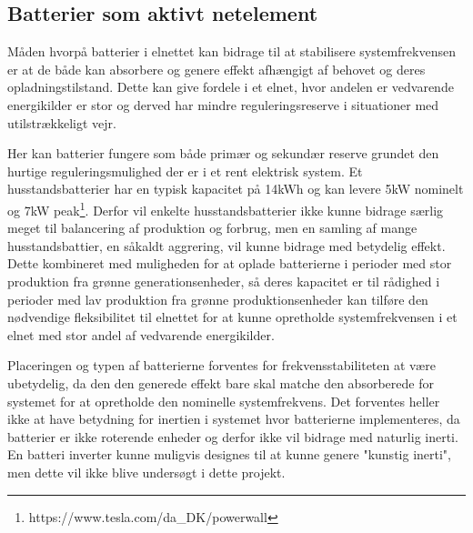 \subsection{Batterier som aktivt netelement}

Måden hvorpå batterier i elnettet kan bidrage til at stabilisere systemfrekvensen er at de både kan absorbere og genere effekt afhængigt af behovet og deres opladningstilstand. Dette kan give fordele i et elnet, hvor andelen er vedvarende energikilder er stor og derved har mindre reguleringsreserve i situationer med utilstrækkeligt vejr.

Her kan batterier fungere som både primær og sekundær reserve grundet den hurtige reguleringsmulighed der er i et rent elektrisk system. Et husstandsbatterier har en typisk kapacitet på 14kWh og kan levere 5kW nominelt og 7kW peak\footnote{https://www.tesla.com/da\_DK/powerwall}. Derfor vil enkelte husstandsbatterier ikke kunne bidrage særlig meget til balancering af produktion og forbrug, men en samling af mange husstandsbattier, en såkaldt aggrering, vil kunne bidrage med betydelig effekt. Dette kombineret med muligheden for at oplade batterierne i perioder med stor produktion fra grønne generationsenheder, så deres kapacitet er til rådighed i perioder med lav produktion fra grønne produktionsenheder kan tilføre den nødvendige fleksibilitet til elnettet for at kunne opretholde systemfrekvensen i et elnet med stor andel af vedvarende energikilder.

Placeringen og typen af batterierne forventes for frekvensstabiliteten at være ubetydelig, da den den generede effekt bare skal matche den absorberede for systemet for at opretholde den nominelle systemfrekvens. Det forventes heller ikke at have betydning for inertien i systemet hvor batterierne implementeres, da batterier er ikke roterende enheder og derfor ikke vil bidrage med naturlig inerti. En batteri inverter kunne muligvis designes til at kunne genere "kunstig inerti", men dette vil ikke blive undersøgt i dette projekt.



